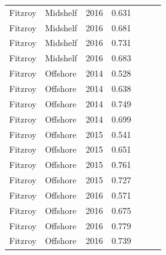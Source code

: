 \begin{longtable}{llccccc}
  Fitzroy & Midshelf & 2016 & 0.631 & \cellcolor[HTML]{F0C918}{C} & \cellcolor[HTML]{B0D235}{B} & \cellcolor[HTML]{F0C918}{C} \\ 
  Fitzroy & Midshelf & 2016 & 0.681 & \cellcolor[HTML]{B0D235}{B} & \cellcolor[HTML]{B0D235}{B} & \cellcolor[HTML]{B0D235}{B} \\ 
  Fitzroy & Midshelf & 2016 & 0.731 & \cellcolor[HTML]{B0D235}{B} & \cellcolor[HTML]{B0D235}{B} & \cellcolor[HTML]{B0D235}{B} \\ 
  Fitzroy & Midshelf & 2016 & 0.683 & \cellcolor[HTML]{B0D235}{B} & \cellcolor[HTML]{B0D235}{B} & \cellcolor[HTML]{B0D235}{B} \\ 
  Fitzroy & Offshore & 2014 & 0.528 & \cellcolor[HTML]{F0C918}{C} & \cellcolor[HTML]{F0C918}{C} & \cellcolor[HTML]{F0C918}{C} \\ 
  Fitzroy & Offshore & 2014 & 0.638 & \cellcolor[HTML]{F0C918}{C} & \cellcolor[HTML]{B0D235}{B} & \cellcolor[HTML]{F0C918}{C} \\ 
  Fitzroy & Offshore & 2014 & 0.749 & \cellcolor[HTML]{B0D235}{B} & \cellcolor[HTML]{B0D235}{B} & \cellcolor[HTML]{B0D235}{B} \\ 
  Fitzroy & Offshore & 2014 & 0.699 & \cellcolor[HTML]{B0D235}{B} & \cellcolor[HTML]{B0D235}{B} & \cellcolor[HTML]{B0D235}{B} \\ 
  Fitzroy & Offshore & 2015 & 0.541 & \cellcolor[HTML]{F0C918}{C} & \cellcolor[HTML]{F0C918}{C} & \cellcolor[HTML]{F0C918}{C} \\ 
  Fitzroy & Offshore & 2015 & 0.651 & \cellcolor[HTML]{F0C918}{C} & \cellcolor[HTML]{B0D235}{B} & \cellcolor[HTML]{B0D235}{B} \\ 
  Fitzroy & Offshore & 2015 & 0.761 & \cellcolor[HTML]{B0D235}{B} & \cellcolor[HTML]{B0D235}{B} & \cellcolor[HTML]{B0D235}{B} \\ 
  Fitzroy & Offshore & 2015 & 0.727 & \cellcolor[HTML]{B0D235}{B} & \cellcolor[HTML]{B0D235}{B} & \cellcolor[HTML]{B0D235}{B} \\ 
  Fitzroy & Offshore & 2016 & 0.571 & \cellcolor[HTML]{F0C918}{C} & \cellcolor[HTML]{F0C918}{C} & \cellcolor[HTML]{F0C918}{C} \\ 
  Fitzroy & Offshore & 2016 & 0.675 & \cellcolor[HTML]{B0D235}{B} & \cellcolor[HTML]{B0D235}{B} & \cellcolor[HTML]{B0D235}{B} \\ 
  Fitzroy & Offshore & 2016 & 0.779 & \cellcolor[HTML]{B0D235}{B} & \cellcolor[HTML]{B0D235}{B} & \cellcolor[HTML]{B0D235}{B} \\ 
  Fitzroy & Offshore & 2016 & 0.739 & \cellcolor[HTML]{B0D235}{B} & \cellcolor[HTML]{B0D235}{B} & \cellcolor[HTML]{B0D235}{B} \\ 

\end{longtable}
